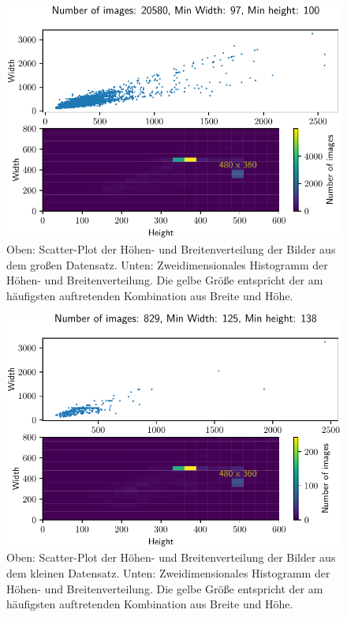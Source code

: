 \begin{figure}
  \centering
  \includegraphics[scale=0.9]{pics/width_height_scatter_hist2d.pdf}
  \caption{Oben: Scatter-Plot der Höhen- und Breitenverteilung der Bilder aus dem großen Datensatz.
  Unten: Zweidimensionales Histogramm der Höhen- und Breitenverteilung.
  Die gelbe Größe entspricht der am häufigsten auftretenden Kombination
  aus Breite und Höhe.}
  \label{fig:scatter_groß}
\end{figure}

\begin{figure}
  \centering
  \includegraphics[scale=0.9]{pics/width_height_scatter_hist2d_klein.pdf}
  \caption{Oben: Scatter-Plot der Höhen- und Breitenverteilung der Bilder aus
  dem kleinen Datensatz.
  Unten: Zweidimensionales Histogramm der Höhen- und Breitenverteilung.
  Die gelbe Größe entspricht der am häufigsten auftretenden Kombination
  aus Breite und Höhe.}
  \label{fig:scatter_klein}
\end{figure}
